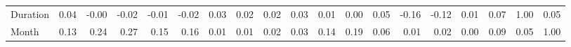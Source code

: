 \begin{tabular}{lrrrrrrrrrrrrrrrrrr}
Duration            &       0.04 &      -0.00 &     -0.02 &     -0.01 &     -0.02 &               0.03 &              0.02 &                 0.02 &                0.03 &         0.01 &         0.00 &     0.05 &          -0.16 &   -0.12 &      0.01 &    0.07 &      1.00 &   0.05 \\
Month               &       0.13 &       0.24 &      0.27 &      0.15 &      0.16 &               0.01 &              0.01 &                 0.02 &                0.03 &         0.14 &         0.19 &     0.06 &           0.01 &    0.02 &      0.00 &    0.09 &      0.05 &   1.00 \\
\bottomrule
\end{tabular}
